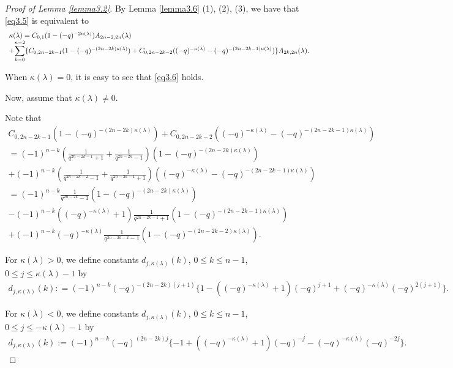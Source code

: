 \documentclass[11pt,oneside]{amsart}
\theoremstyle{plain}
\theoremstyle{definition}
\theoremstyle{remark}
\numberwithin{equation}{section}
\begin{document}
\begin{proof}[Proof of Lemma \ref{lemma3.2}]
		By Lemma \ref{lemma3.6} (1), (2), (3), we have that \eqref{eq3.5} is equivalent to
		\begin{equation}\label{eq3.6}
			\begin{array}{l}
				\kappa(\lambda)=C_{0,1}(1-(-q)^{-2\kappa(\lambda)})A_{2n-2,2n}(\lambda)\\+
				\mathlarger{\sum}_{k=0}^{n-2}\lbrace C_{0,2n-2k-1}(1-(-q)^{-(2n-2k)\kappa(\lambda)})+C_{0,2n-2k-2}((-q)^{-\kappa(\lambda)}-(-q)^{-(2n-2k-1)\kappa(\lambda)})\rbrace A_{2k,2n}(\lambda).
			\end{array}
		\end{equation}
		
		When $\kappa(\lambda)=0$, it is easy to see that \eqref{eq3.6} holds.
		
		Now, assume that $\kappa(\lambda) \neq 0$.
		
		Note that
		\begin{equation*}\begin{array}{l}
				C_{0,2n-2k-1}(1-(-q)^{-(2n-2k)\kappa(\lambda)})+C_{0,2n-2k-2}((-q)^{-\kappa(\lambda)}-(-q)^{-(2n-2k-1)\kappa(\lambda)})\\
				=(-1)^{n-k} (\frac{1}{q^{2n-2k-1}+1}+\frac{1}{q^{2n-2k}-1})(1-(-q)^{-(2n-2k)\kappa(\lambda)})\\
				+(-1)^{n-k}(\frac{1}{q^{2n-2k-2}-1}+\frac{1}{q^{2n-2k-1}+1})((-q)^{-\kappa(\lambda)}-(-q)^{-(2n-2k-1)\kappa(\lambda)})
				\\
				=(-1)^{n-k}\frac{1}{q^{2n-2k}-1}(1-(-q)^{-(2n-2k)\kappa(\lambda)})\\
				-(-1)^{n-k}((-q)^{-\kappa(\lambda)}+1)\frac{1}{q^{2n-2k-1}+1}(1-(-q)^{-(2n-2k-1)\kappa(\lambda)})\\
				+(-1)^{n-k}(-q)^{-\kappa(\lambda)}\frac{1}{q^{2n-2k-2}-1}(1-(-q)^{-(2n-2k-2)\kappa(\lambda)}).
			\end{array}
		\end{equation*}
		
		For $\kappa(\lambda) >0$, we define constants $d_{j,\kappa(\lambda)}(k)$, $0 \leq k \leq n-1$, $0 \leq j \leq \kappa(\lambda)-1$ by
		\begin{equation*}\begin{array}{l}
				d_{j,\kappa(\lambda)}(k):
				=(-1)^{n-k}(-q)^{-(2n-2k)(j+1)}\lbrace 1-((-q)^{-\kappa(\lambda)}+1)(-q)^{j+1}+(-q)^{-\kappa(\lambda)}(-q)^{2(j+1)}\rbrace.
			\end{array}
		\end{equation*}
		
		For $\kappa(\lambda) <0$, we define constants $d_{j,\kappa(\lambda)}(k)$, $0 \leq k \leq n-1$, $0 \leq j \leq -\kappa(\lambda)-1$ by
		\begin{equation*}\begin{array}{l}
				d_{j,\kappa(\lambda)}(k):=(-1)^{n-k}(-q)^{(2n-2k)j}\lbrace-1+((-q)^{-\kappa(\lambda)}+1)(-q)^{-j}-(-q)^{-\kappa(\lambda)}(-q)^{-2j}\rbrace.
			\end{array}
		\end{equation*}
		

\end{proof}
\end{document}
